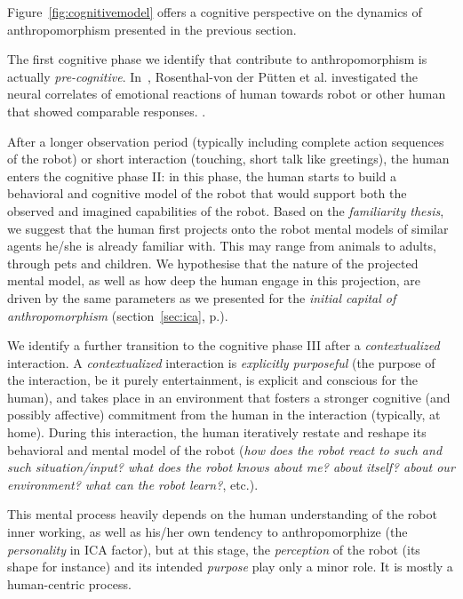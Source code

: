 \documentclass[lettersize, apacite, twoside, HRI]{apa_HRI}
\begin{document}
Figure~\ref{fig:cognitivemodel} offers a cognitive perspective on the dynamics
of anthropomorphism presented in the previous section.

The first cognitive phase we identify that contribute to anthropomorphism is
actually \emph{pre-cognitive}. In~\cite{Rosenthal-vonderPutten2013Neural},
Rosenthal-von der Pütten et al. investigated the neural correlates of emotional
reactions of human towards robot or other human that showed comparable
responses. .

After a longer observation period (typically including complete action
sequences of the robot) or short interaction (touching, short talk like
greetings), the human enters the cognitive phase II: in this phase, the human
starts to build a behavioral and cognitive model of the robot that would
support both the observed and imagined capabilities of the robot. Based on the
\emph{familiarity thesis}, we suggest that the human first
projects onto the robot mental models of similar agents he/she is already
familiar with. This may range from animals to adults, through pets and
children. We hypothesise that the nature of the projected mental model, as well
as how deep the human engage in this projection, are driven by the same
parameters as we presented for the \emph{initial capital of anthropomorphism}
(section~\ref{sec:ica}, p.\pageref{sec:ica}).

We identify a further transition to the cognitive phase III after a
\emph{contextualized} interaction. A \emph{contextualized} interaction is
\emph{explicitly purposeful} (the purpose of the interaction, be it purely
entertainment, is explicit and conscious for the human), and takes place in an
environment that fosters a stronger cognitive (and possibly affective)
commitment from the human in the interaction (typically, at home). During this
interaction, the human iteratively restate and reshape its behavioral and
mental model of the robot (\emph{how does the robot react to such and such
situation/input? what does the robot knows about me? about itself? about our
environment? what can the robot learn?}, etc.).

This mental process heavily depends on the human understanding of the robot
inner working, as well as his/her own tendency to anthropomorphize (the
\emph{personality} in ICA factor), but at this stage, the \emph{perception} of
the robot (its shape for instance) and its intended \emph{purpose} play only a
minor role. It is mostly a human-centric process.
\end{document}
